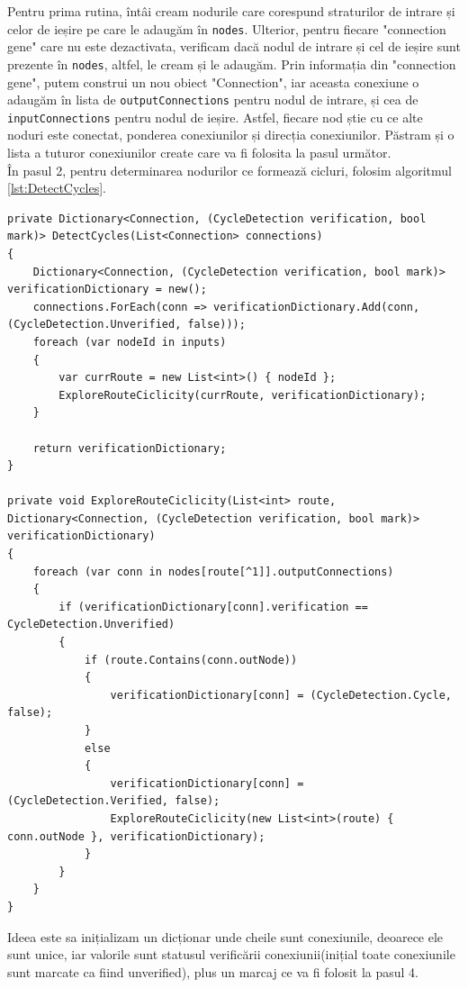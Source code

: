 Pentru prima rutina, întâi cream nodurile care corespund straturilor de intrare și celor de ieșire pe care le adaugăm în \texttt{nodes}.
Ulterior, pentru fiecare "connection gene" care nu este dezactivata, verificam dacă nodul de intrare și cel de ieșire sunt prezente în \texttt{nodes}, altfel, le cream și le adaugăm.
Prin informația din "connection gene", putem construi un nou obiect "Connection", iar aceasta conexiune o adaugăm în lista de \texttt{output\-Connections} pentru nodul de intrare, și cea de \texttt{input\-Connections} pentru nodul de ieșire.
Astfel, fiecare nod știe cu ce alte noduri este conectat, ponderea conexiunilor și direcția conexiunilor. Păstram și o lista a tuturor conexiunilor create care va fi folosita la pasul următor.
\\
În pasul 2, pentru determinarea nodurilor ce formează cicluri, folosim algoritmul \ref{lst:DetectCycles}.
\begin{lstlisting}[caption={Algoritmul de detectare a conexiunilor ce formeaza cicluri}, label={lst:DetectCycles}]
private Dictionary<Connection, (CycleDetection verification, bool mark)> DetectCycles(List<Connection> connections)
{
    Dictionary<Connection, (CycleDetection verification, bool mark)> verificationDictionary = new();
    connections.ForEach(conn => verificationDictionary.Add(conn, (CycleDetection.Unverified, false)));
    foreach (var nodeId in inputs)
    {
        var currRoute = new List<int>() { nodeId };
        ExploreRouteCiclicity(currRoute, verificationDictionary);
    }

    return verificationDictionary;
}

private void ExploreRouteCiclicity(List<int> route, Dictionary<Connection, (CycleDetection verification, bool mark)> verificationDictionary)
{
    foreach (var conn in nodes[route[^1]].outputConnections)
    {
        if (verificationDictionary[conn].verification == CycleDetection.Unverified)
        {
            if (route.Contains(conn.outNode))
            {
                verificationDictionary[conn] = (CycleDetection.Cycle, false);
            }
            else
            {
                verificationDictionary[conn] = (CycleDetection.Verified, false);
                ExploreRouteCiclicity(new List<int>(route) { conn.outNode }, verificationDictionary);
            }
        }
    }
}
\end{lstlisting}
Ideea este sa inițializam un dicționar unde cheile sunt conexiunile, deoarece ele sunt unice, iar valorile sunt statusul verificării conexiunii(inițial toate conexiunile sunt marcate ca fiind unverified), plus un marcaj ce va fi folosit la pasul 4.
